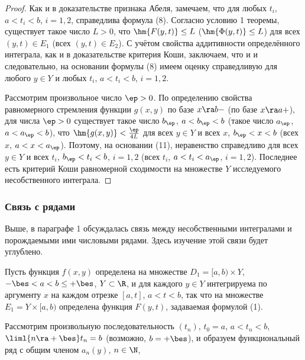 \documentclass[a4paper]{article}
\begin{document}
\begin{proof}
Как и в доказательстве признака Абеля, замечаем, что для любых
$t_i$, $a<t_i<b$, $i=1,2$, справедлива формула (8). Согласно условию
1 теоремы, существует такое число $L>0$, что $\hm{F(y,t)}\le L$
($\hm{\Phi(y,t)}\le L$) для всех $(y,t)\in E_1$ (всех $(y,t)\in
E_2$). С учётом свойства аддитивности определённого интеграла, как и
в доказательстве критерия Коши, заключаем, что
 и  и следовательно, на основании формулы (8)
имеем оценку  справедливую для любого $y\in
Y$ и любых $t_i$, $a<t_i<b$, $i=1,2$.

Рассмотрим произвольное число $\ep>0$. По определению свойства
равномерного стремления функции $g(x,y)$ по базе $x\ra b-$ (по базе
$x\ra a+$), для числа $\ep>0$ существует такое число $b_{\ep}$,
$a<b_{\ep}<b$ (такое число $a_{\ep}$, $a<a_{\ep}<b$), что
$\hm{g(x,y)} < \frac{\ep}{4L}$ для всех $y\in Y$ и всех $x$,
$b_{\ep}<x<b$ (всех $x$, $a<x<a_{\ep}$). Поэтому, на основании (11),
неравенство  справедливо для всех
$y\in Y$ и всех $t_i$, $b_{\ep}<t_i<b$, $i=1,2$ (всех $t_i$,
$a<t_i<a_{\ep}$, $i=1,2$). Последнее есть критерий Коши равномерной
сходимости на множестве $Y$ исследуемого несобственного интеграла.
\end{proof}

\subsubsection{Связь с рядами}
Выше, в параграфе 1 обсуждалась связь между несобственными
интегралами и порождаемыми ими числовыми рядами. Здесь изучение этой
связи будет углублено.

Пусть функция $f(x,y)$ определена на множестве $D_1=[a,b)\times Y$,
$-\bes<a<b\le+\bes$, $Y\subset\R$, и для каждого $y\in Y$
интегрируема по аргументу $x$ на каждом отрезке $[a,t]$, $a<t<b$,
так что на множестве $E_1=Y\times[a,b)$ определена функция $F(y,t)$,
задаваемая формулой (1).

Рассмотрим произвольную последовательность $(t_n)$, $t_0=a$,
$a<t_n<b$, $\liml{n\ra+\bes}t_n=b$ (возможно, $b=+\bes$), и образуем
функциональный ряд  с общим
членом $a_n(y)$, $n\in\N$, 
\end{document}
